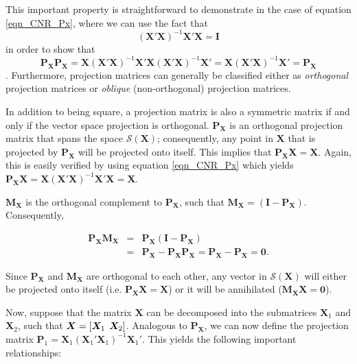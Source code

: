 This important property is straightforward to demonstrate in the case of equation \eqref{eqn_CNR_Px}, where we can use the fact that $$(\boldsymbol{X}'\boldsymbol{X})^{-1}\boldsymbol{X}'\boldsymbol{X}=\boldsymbol{I}$$ in order to show that $$\boldsymbol{P_{X}}\boldsymbol{P_{X}}=\boldsymbol{X}(\boldsymbol{X}'\boldsymbol{X})^{-1}\boldsymbol{X}'\boldsymbol{X}(\boldsymbol{X}'
\boldsymbol{X})^{-1}\boldsymbol{X}'=\boldsymbol{X}(\boldsymbol{X}'\boldsymbol{X})^{-1}\boldsymbol{X}'=\boldsymbol{P_{X}}$$. Furthermore, projection matrices can generally be classified either as \emph{orthogonal} projection matrices or \emph{oblique} (non-orthogonal) projection matrices.

In addition to being square, a projection matrix is also a symmetric matrix if and only if the vector space projection is orthogonal. $\boldsymbol{P_{X}}$ is an orthogonal projection matrix that spans the space $\mathcal{S}(\boldsymbol{X})$; consequently, any point in $\boldsymbol{X}$ that is projected by $\boldsymbol{P_{X}}$ will be projected onto itself. This implies that $\boldsymbol{P_{X}}\boldsymbol{X} = \boldsymbol{X}$. Again, this is easily verified by using equation \eqref{eqn_CNR_Px} which yields $\boldsymbol{P_{X}}\boldsymbol{X}=\boldsymbol{X}(\boldsymbol{X}'\boldsymbol{X})^{-1}\boldsymbol{X}'\boldsymbol{X} = \boldsymbol{X}$.

$\boldsymbol{M_{X}}$ is the orthogonal complement to $\boldsymbol{P_{X}}$, such that $\boldsymbol{M_{X}} = (\boldsymbol{I} - \boldsymbol{P_{X}})$. Consequently,

\begin{eqnarray}
\boldsymbol{P_{X}}\boldsymbol{M_{X}} &=& \boldsymbol{P_{X}}(\boldsymbol{I} - \boldsymbol{P_{X}}) \nonumber \\
&=& \boldsymbol{P_{X}}-\boldsymbol{P_{X}}\boldsymbol{P_{X}} = \boldsymbol{P_{X}}-\boldsymbol{P_{X}}=\boldsymbol{0}.
\end{eqnarray}

Since $\boldsymbol{P_{X}}$ and $\boldsymbol{M_{X}}$ are orthogonal to each other, any vector in $\mathcal{S}(\boldsymbol{X})$ will either be projected onto itself (i.e. $\boldsymbol{P_{X}}\boldsymbol{X} = \boldsymbol{X}$) or it will be annihilated ($\boldsymbol{M_{X}}\boldsymbol{X} = \boldsymbol{0}$).

Now, suppose that the matrix $\boldsymbol{X}$ can be decomposed into the submatrices $\boldsymbol{X}_{1}$ and $\boldsymbol{X}_{2}$, such that $\boldsymbol{X} = [\boldsymbol{X}_{1}\hspace{1ex}\boldsymbol{X}_{2}]$. Analogous to $\boldsymbol{P_{X}}$, we can now define the projection matrix $\boldsymbol{P}_{1} = \boldsymbol{X}_{1}(\boldsymbol{X}_{1}'\boldsymbol{X}_{1})^{-1}\boldsymbol{X}_{1}'$. This yields the following important relationships:

